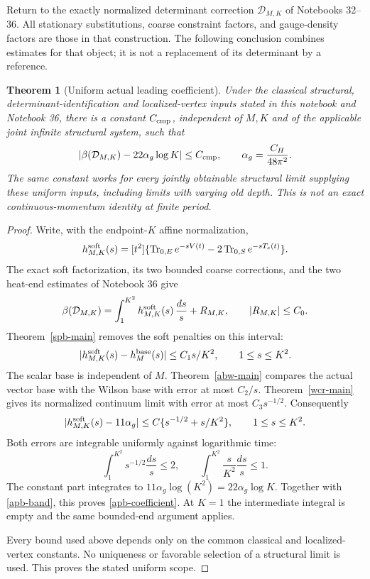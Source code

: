 \documentclass[11pt]{article}
\newtheorem{theorem}{Theorem}[section]
\theoremstyle{remark}
\begin{document}
Return to the exactly normalized determinant correction
\(\mathcal D_{M,K}\) of Notebooks 32--36. All stationary substitutions,
coarse constraint factors, and gauge-density factors are those in
that construction. The following conclusion combines estimates for
that object; it is not a replacement of its determinant by a reference.

\begin{theorem}[Uniform actual leading coefficient]
\label{apb-main}
Under the classical structural, determinant-identification and
localized-vertex inputs stated in this notebook and Notebook 36,
there is a constant \(C_{\rm cmp}\), independent of \(M,K\) and of
the applicable joint infinite structural system, such that
\begin{equation}
 \left|\beta(\mathcal D_{M,K})
                    -22\alpha_g\log K\right|\le C_{\rm cmp},
 \qquad \alpha_g=\frac{C_H}{48\pi^2}.
 \label{apb-coefficient}
\end{equation}
The same constant works for every jointly obtainable structural limit
supplying these uniform inputs, including limits with varying old depth.
This is not an exact continuous-momentum identity at finite period.
\end{theorem}

\begin{proof}
Write, with the endpoint-\(K\) affine normalization,
\[
 h^{\rm soft}_{M,K}(s)
  =[t^2]\{\operatorname{Tr}_{0,E}e^{-sV(t)}
                   -2\operatorname{Tr}_{0,S}e^{-sT_s(t)}\}.
\]
The exact soft factorization, its two bounded coarse corrections,
and the two heat-end estimates of Notebook 36 give
\begin{equation}
 \beta(\mathcal D_{M,K})
       =\int_1^{K^2}h^{\rm soft}_{M,K}(s)\,\frac{ds}{s}+R_{M,K},
 \qquad |R_{M,K}|\le C_0.
 \label{apb-band}
\end{equation}
Theorem~\ref{spb-main} removes the soft penalties on this interval:
\[
 |h^{\rm soft}_{M,K}(s)-h^{\rm base}_M(s)|
       \le C_1s/K^2,\qquad 1\le s\le K^2.
\]
The scalar base is independent of \(M\).
Theorem~\ref{abw-main} compares the actual vector base with the
Wilson base with error at most \(C_2/s\). Theorem~\ref{wcr-main}
gives its normalized continuum limit with error at most
\(C_3s^{-1/2}\). Consequently
\begin{equation}
 |h^{\rm soft}_{M,K}(s)-11\alpha_g|
       \le C\{s^{-1/2}+s/K^2\},
       \qquad 1\le s\le K^2.
 \label{apb-plateau}
\end{equation}
Both errors are integrable uniformly against logarithmic time:
\[
 \int_1^{K^2}s^{-1/2}\frac{ds}{s}\le2,\qquad
 \int_1^{K^2}\frac{s}{K^2}\frac{ds}{s}\le1.
\]
The constant part integrates to
\(11\alpha_g\log(K^2)=22\alpha_g\log K\).
Together with \eqref{apb-band}, this proves
\eqref{apb-coefficient}. At \(K=1\) the intermediate integral is
empty and the same bounded-end argument applies.

Every bound used above depends only on the common classical and
localized-vertex constants. No uniqueness or favorable selection of
a structural limit is used. This proves the stated uniform scope.
\end{proof}
\end{document}
